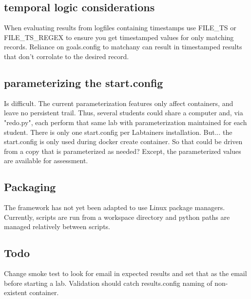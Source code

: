 \documentclass[12pt]{article}
\begin{document}
\subsection {temporal logic considerations}
When evaluating results from logfiles containing timestamps use FILE\_TS or FILE\_TS\_REGEX
to ensure you get timestamped values for only matching records. Reliance on goals.config to
matchany can result in timestamped results that don't corrolate to the desired record. 

\subsection {parameterizing the start.config}
Is difficult.  The current parameterization features only affect containers, and leave no
persistent trail.  Thus, several students could share a computer and, via "redo.py", each 
perform that same lab with parameterization maintained for each student.  There is only one
start.config per Labtainers installation.   But... the start.config is only used during
docker create container.  So that could be driven from a copy that is parameterized as needed?
Except, the parameterized values are available for assessment.

\subsection {Packaging}
The framework has not yet been adapted to use Linux package managers.
Currently, scripts are run from a workspace directory and python
paths are managed relatively between scripts.  

\subsection{Todo}
Change smoke test to look for email in expected results and set that as the email before starting a lab.
Validation should catch results.config naming of non-existent container.
\end{document}
